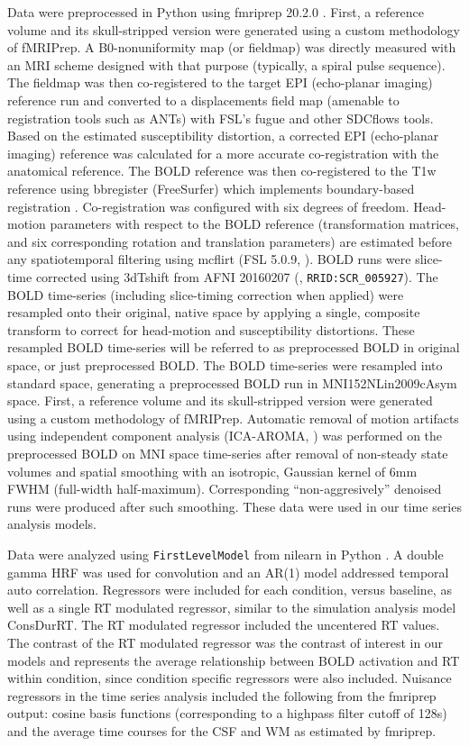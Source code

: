 \documentclass[titlepage,12pt] {article}
\begin{document}
Data were preprocessed in Python using fmriprep 20.2.0 \citep{esteban2019}.  First, a reference volume and its skull-stripped version were generated using a custom methodology of fMRIPrep. A B0-nonuniformity map (or fieldmap) was directly measured with an MRI scheme designed with that purpose (typically, a spiral pulse sequence). The fieldmap was then co-registered to the target EPI (echo-planar imaging) reference run and converted to a displacements field map (amenable to registration tools such as ANTs) with FSL’s fugue and other SDCflows tools. Based on the estimated susceptibility distortion, a corrected EPI (echo-planar imaging) reference was calculated for a more accurate co-registration with the anatomical reference. The BOLD reference was then co-registered to the T1w reference using bbregister (FreeSurfer) which implements boundary-based registration \citep{greve2009}. Co-registration was configured with six degrees of freedom. Head-motion parameters with respect to the BOLD reference (transformation matrices, and six corresponding rotation and translation parameters) are estimated before any spatiotemporal filtering using mcflirt (FSL 5.0.9, \citet{jenkinson2002}). BOLD runs were slice-time corrected using 3dTshift from AFNI 20160207 (\citet{cox1997}, \verb+RRID:SCR_005927+). The BOLD time-series (including slice-timing correction when applied) were resampled onto their original, native space by applying a single, composite transform to correct for head-motion and susceptibility distortions. These resampled BOLD time-series will be referred to as preprocessed BOLD in original space, or just preprocessed BOLD. The BOLD time-series were resampled into standard space, generating a preprocessed BOLD run in MNI152NLin2009cAsym space. First, a reference volume and its skull-stripped version were generated using a custom methodology of fMRIPrep. Automatic removal of motion artifacts using independent component analysis (ICA-AROMA, \citet{pruim2015}) was performed on the preprocessed BOLD on MNI space time-series after removal of non-steady state volumes and spatial smoothing with an isotropic, Gaussian kernel of 6mm FWHM (full-width half-maximum). Corresponding “non-aggresively” denoised runs were produced after such smoothing.  These data were used in our time series analysis models.


Data were analyzed using \verb+FirstLevelModel+ from nilearn in Python \citep{abrahamMachineLearningNeuroimaging2014}.  A double gamma HRF was used for convolution and an AR(1) model addressed temporal auto correlation.  Regressors were included for each condition, versus baseline, as well as a single RT modulated regressor, similar to the simulation analysis model ConsDurRT.  The RT modulated regressor included the uncentered RT values.  The contrast of the RT modulated regressor was the contrast of interest in our models and represents the average relationship between BOLD activation and RT within condition, since condition specific regressors were also included.  Nuisance regressors in the time series analysis included the following from the fmriprep output: cosine basis functions (corresponding to a highpass filter cutoff of 128s) and the average time courses for the CSF and WM as estimated by fmriprep. 
\end{document}
